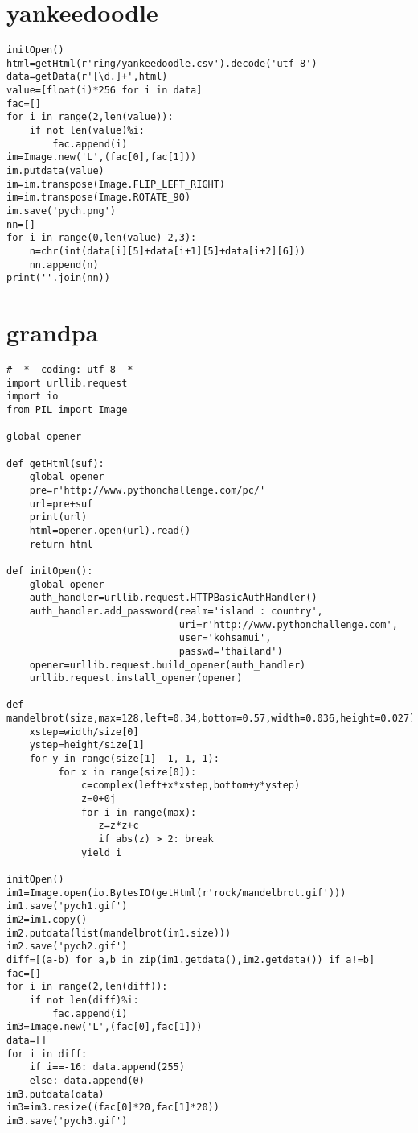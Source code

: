 \documentclass[onecolumn,a4paper,12pt]{article}
\begin{document}
\section{yankeedoodle}
\begin{lstlisting}
initOpen()
html=getHtml(r'ring/yankeedoodle.csv').decode('utf-8')
data=getData(r'[\d.]+',html)
value=[float(i)*256 for i in data]
fac=[]
for i in range(2,len(value)):
    if not len(value)%i:
        fac.append(i)
im=Image.new('L',(fac[0],fac[1]))
im.putdata(value)
im=im.transpose(Image.FLIP_LEFT_RIGHT)
im=im.transpose(Image.ROTATE_90)
im.save('pych.png')
nn=[]
for i in range(0,len(value)-2,3):
    n=chr(int(data[i][5]+data[i+1][5]+data[i+2][6]))
    nn.append(n)
print(''.join(nn))
\end{lstlisting}

\section{grandpa}
\begin{lstlisting}
# -*- coding: utf-8 -*-
import urllib.request
import io
from PIL import Image

global opener

def getHtml(suf):
    global opener
    pre=r'http://www.pythonchallenge.com/pc/'
    url=pre+suf
    print(url)
    html=opener.open(url).read()
    return html

def initOpen():
    global opener
    auth_handler=urllib.request.HTTPBasicAuthHandler()
    auth_handler.add_password(realm='island : country',
                              uri=r'http://www.pythonchallenge.com',
                              user='kohsamui',
                              passwd='thailand')
    opener=urllib.request.build_opener(auth_handler)
    urllib.request.install_opener(opener)

def mandelbrot(size,max=128,left=0.34,bottom=0.57,width=0.036,height=0.027):
    xstep=width/size[0]
    ystep=height/size[1]
    for y in range(size[1]- 1,-1,-1):
         for x in range(size[0]):
             c=complex(left+x*xstep,bottom+y*ystep)
             z=0+0j
             for i in range(max):
                z=z*z+c
                if abs(z) > 2: break
             yield i

initOpen()
im1=Image.open(io.BytesIO(getHtml(r'rock/mandelbrot.gif')))
im1.save('pych1.gif')
im2=im1.copy()
im2.putdata(list(mandelbrot(im1.size)))
im2.save('pych2.gif')
diff=[(a-b) for a,b in zip(im1.getdata(),im2.getdata()) if a!=b]
fac=[]
for i in range(2,len(diff)):
    if not len(diff)%i:
        fac.append(i)
im3=Image.new('L',(fac[0],fac[1]))
data=[]
for i in diff:
    if i==-16: data.append(255)
    else: data.append(0)
im3.putdata(data)
im3=im3.resize((fac[0]*20,fac[1]*20))
im3.save('pych3.gif')
\end{lstlisting}
\end{document}
